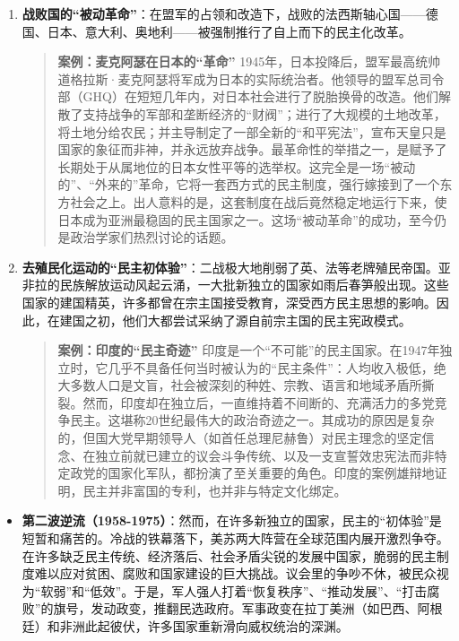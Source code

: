 \begin{enumerate}
    \item \textbf{战败国的“被动革命”}：在盟军的占领和改造下，战败的法西斯轴心国——德国、日本、意大利、奥地利——被强制推行了自上而下的民主化改革。
    \begin{quote}
    \textbf{案例：麦克阿瑟在日本的“革命”}
    1945年，日本投降后，盟军最高统帅道格拉斯·麦克阿瑟将军成为日本的实际统治者。他领导的盟军总司令部（GHQ）在短短几年内，对日本社会进行了脱胎换骨的改造。他们解散了支持战争的军部和垄断经济的“财阀”；进行了大规模的土地改革，将土地分给农民；并主导制定了一部全新的“和平宪法”，宣布天皇只是国家的象征而非神，并永远放弃战争。最革命性的举措之一，是赋予了长期处于从属地位的日本女性平等的选举权。这完全是一场“被动的”、“外来的”革命，它将一套西方式的民主制度，强行嫁接到了一个东方社会之上。出人意料的是，这套制度在战后竟然稳定地运行下来，使日本成为亚洲最稳固的民主国家之一。这场“被动革命”的成功，至今仍是政治学家们热烈讨论的话题。
    \end{quote}
    \item \textbf{去殖民化运动的“民主初体验”}：二战极大地削弱了英、法等老牌殖民帝国。亚非拉的民族解放运动风起云涌，一大批新独立的国家如雨后春笋般出现。这些国家的建国精英，许多都曾在宗主国接受教育，深受西方民主思想的影响。因此，在建国之初，他们大都尝试采纳了源自前宗主国的民主宪政模式。
    \begin{quote}
    \textbf{案例：印度的“民主奇迹”}
    印度是一个“不可能”的民主国家。在1947年独立时，它几乎不具备任何当时被认为的“民主条件”：人均收入极低，绝大多数人口是文盲，社会被深刻的种姓、宗教、语言和地域矛盾所撕裂。然而，印度却在独立后，一直维持着不间断的、充满活力的多党竞争民主。这堪称20世纪最伟大的政治奇迹之一。其成功的原因是复杂的，但国大党早期领导人（如首任总理尼赫鲁）对民主理念的坚定信念、在独立前就已建立的议会斗争传统、以及一支宣誓效忠宪法而非特定政党的国家化军队，都扮演了至关重要的角色。印度的案例雄辩地证明，民主并非富国的专利，也并非与特定文化绑定。
    \end{quote}
\end{enumerate}

\begin{itemize}
    \item \textbf{第二波逆流（1958-1975）}：然而，在许多新独立的国家，民主的“初体验”是短暂和痛苦的。冷战的铁幕落下，美苏两大阵营在全球范围内展开激烈争夺。在许多缺乏民主传统、经济落后、社会矛盾尖锐的发展中国家，脆弱的民主制度难以应对贫困、腐败和国家建设的巨大挑战。议会里的争吵不休，被民众视为“软弱”和“低效”。于是，军人强人打着“恢复秩序”、“推动发展”、“打击腐败”的旗号，发动政变，推翻民选政府。军事政变在拉丁美洲（如巴西、阿根廷）和非洲此起彼伏，许多国家重新滑向威权统治的深渊。
\end{itemize}

